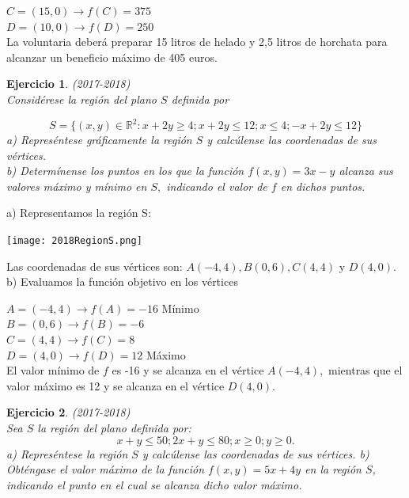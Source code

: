 \documentclass[12pt, a4paper]{amsart}
\newtheorem{ejer}{Ejercicio}
\newcommand{\s}{\color[rgb]{0,0,0.5}}
\newcommand{\n}{\color[rgb]{0,0,0}}
\begin{document}
$C=(15,0) \rightarrow f(C)=375$\\

$D=(10,0) \rightarrow f(D)=250$\\

La voluntaria deberá preparar 15 litros de helado y 2,5 litros de horchata para alcanzar un beneficio máximo de 405 euros.



\n

\newpage

\begin{ejer}\em (2017-2018)\\
Considérese la región del plano $S$ definida por

\[
S=\{(x,y)\in \mathbb{R}^2: x+2y\geq 4; x+2y\leq 12; x\leq 4; -x+2y\leq 12\}
\]
a) Represéntese gráficamente la región $S$ y calcúlense las coordenadas de sus vértices.\\
b) Determínense los puntos en los que la función $f(x,y)= 3x - y$ alcanza sus valores máximo y mínimo en $S,$ indicando el valor de $f$ en dichos puntos.

\end{ejer}
\s

a) Representamos la región S:

\begin{center}
\texttt{[image: 2018RegionS.png]}
\end{center}



Las coordenadas de sus vértices son: $A(-4,4), B(0,6), C(4,4)$ y $D(4,0).$\\

b) Evaluamos la función objetivo en los vértices
 
$A=(-4,4) \rightarrow f(A)=-16$ Mínimo\\

$B=(0,6) \rightarrow f(B)=-6$\\

$C=(4,4) \rightarrow f(C)=8$\\

$D=(4,0) \rightarrow f(D)=12$ Máximo\\

El valor mínimo de $f$ es -16 y se alcanza en el vértice $A(-4,4),$ mientras que el valor máximo es 12 y se alcanza en el vértice $D(4,0).$

\n


\begin{ejer}\em (2017-2018)\\
Sea $S$ la región del plano definida por:
\[
x+y\leq 50 ; 2x+y\leq 80 ; x\geq 0 ; y\geq 0.
\]
a) Represéntese la región $S$ y calcúlense las coordenadas de sus vértices.
b) Obténgase el valor máximo de la función $f (x, y ) = 5x + 4y$ en la región $S$, indicando el punto en el cual se alcanza dicho valor máximo.
\end{ejer}
\s
\end{document}
